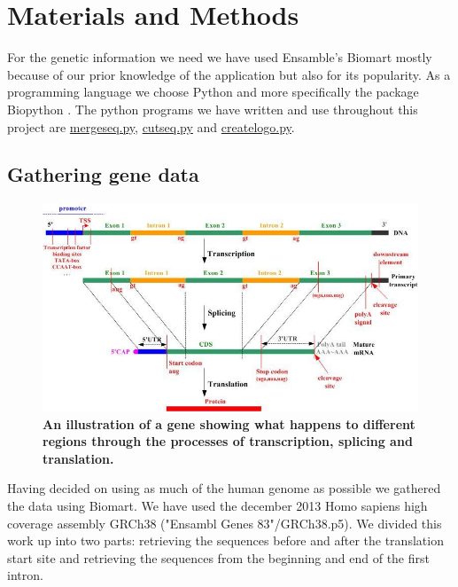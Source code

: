 \documentclass[10pt,letterpaper]{article}
\begin{document}
\section*{Materials and Methods}
For the genetic information we need we have used Ensamble's Biomart \cite{bib3} mostly because of our prior knowledge of the application but also for its popularity. As a programming language we choose Python and more specifically the package Biopython \cite{bib4}. The python programs we have written and use throughout this project are \href{https://github.com/jolo2486/unravel_motifs/blob/master/bin/mergeseq.py}{mergeseq.py}, \href{https://github.com/jolo2486/unravel_motifs/blob/master/bin/cutseq.py}{cutseq.py} and \href{https://github.com/jolo2486/unravel_motifs/blob/master/bin/createlogo.py}{createlogo.py}.

\subsection*{Gathering gene data}

\begin{figure}[h]
\includegraphics[width=5in]{gene_composition.jpg}
\caption{\bf An illustration of a gene showing what happens to different regions through the processes of transcription, splicing and translation.\cite{bib5}}
\label{fig1}
\end{figure}

Having decided on using as much of the human genome as possible we gathered the data using Biomart. We have used the december 2013 Homo sapiens high coverage assembly GRCh38 ("Ensambl Genes 83"/GRCh38.p5). We divided this work up into two parts: retrieving the sequences before and after the translation start site and retrieving the sequences from the beginning and end of the first intron.
\end{document}
